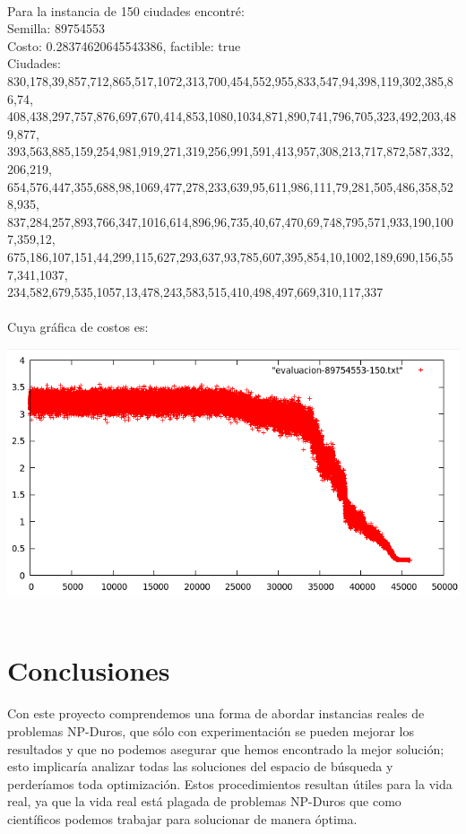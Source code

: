\documentclass[a4paper]{article}
\begin{document}
\\
Para la instancia de 150 ciudades encontré:\\
Semilla: 89754553\\
Costo: 0.28374620645543386, factible: true\\
Ciudades:\\
830,178,39,857,712,865,517,1072,313,700,454,552,955,833,547,94,398,119,302,385,86,74,\\
408,438,297,757,876,697,670,414,853,1080,1034,871,890,741,796,705,323,492,203,489,877,\\
393,563,885,159,254,981,919,271,319,256,991,591,413,957,308,213,717,872,587,332,206,219,\\
654,576,447,355,688,98,1069,477,278,233,639,95,611,986,111,79,281,505,486,358,528,935,\\
837,284,257,893,766,347,1016,614,896,96,735,40,67,470,69,748,795,571,933,190,1007,359,12,\\
675,186,107,151,44,299,115,627,293,637,93,785,607,395,854,10,1002,189,690,156,557,341,1037,\\
234,582,679,535,1057,13,478,243,583,515,410,498,497,669,310,117,337\\
\\
Cuya gráfica de costos es:


\includegraphics[width=\textwidth]{graficas/grafica-89754553-150.png}\\
\\
\section{Conclusiones}

Con este proyecto comprendemos una forma de abordar instancias reales de problemas NP-Duros, que sólo con experimentación se pueden mejorar los resultados y que no podemos asegurar que hemos encontrado la mejor solución; esto implicaría analizar todas las soluciones del espacio de búsqueda y perderíamos toda optimización. Estos procedimientos resultan útiles para la vida real, ya que la vida real está plagada de problemas NP-Duros que como científicos podemos trabajar para solucionar de manera óptima.
\end{document}
